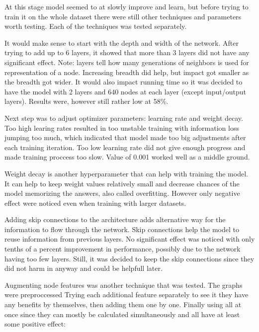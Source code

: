 At this stage model seemed to at slowly improve and learn, but before trying to train it on the whole dataset there were still other techniques and parameters worth testing. Each of the techniques was tested separately. 

It would make sense to start with the depth and width of the network. After trying to add up to 6 layers, it showed that more than 3 layers did not have any significant effect. Note: layers tell how many generations of neighbors is used for representation of a node. Increasing breadth did help, but impact got smaller as the breadth got wider. It would also impact running time so it was decided to have the model with 2 layers and 640 nodes at each layer (except input/output layers). Results were, however still rather low at  58\%.

Next step was to adjust optimizer parameters: learning rate and weight decay. Too high learing rates resulted in too unstable training with information loss jumping too much, which indicated that model made too big adjustments after each training iteration. Too low learning rate did not give enough progress and made training proccess too slow. Value of 0.001 worked well as a middle ground.

Weight decay is another hyperparameter that can help with training the model. It can help to keep weight values relatively small and decrease chances of the model memorizing the answers, also called overfitting. However only negative effect were noticed even when training with larger datasets.

Adding skip connections to the architecture adds alternative way for the information to flow through the network. Skip connections help the model to reuse information from previous layers. No significant effect was noticed with only tenths of a percent improvement in performance, possibly due to the network having too few layers. Still, it was decided to keep the skip connections since they did not harm in anyway and could be helpfull later.

Augmenting node features was another technique that was tested. The graphs were preproccessed  Trying each additional feature separately to see it they have any benefits by themselves, then adding them one by one. Finally using all at once since they can mostly be calculated simultaneously and all have at least some positive effect:

